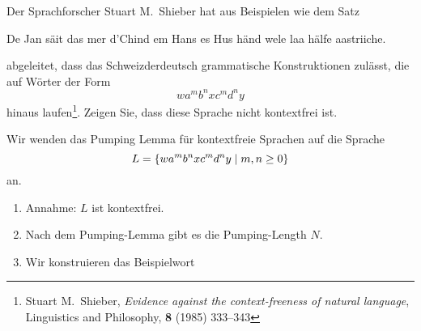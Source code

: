 Der Sprachforscher Stuart M.~Shieber hat aus Beispielen wie dem Satz
\begin{center}
De Jan säit das mer d'Chind em Hans es Hus händ wele laa hälfe aastriiche.
\end{center}
abgeleitet, dass das Schweizderdeutsch grammatische Konstruktionen
zulässt, die auf Wörter der Form
\[
wa^mb^nxc^md^ny
\]
hinaus laufen\footnote{Stuart M.~Shieber,
{\em Evidence against the context-freeness of natural language},
Linguistics and Philosophy, {\bf 8} (1985) 333--343}.
Zeigen Sie, dass diese Sprache nicht kontextfrei ist.


\begin{loesung}
Wir wenden das Pumping Lemma für kontextfreie Sprachen auf die Sprache
\[
L=\{
wa\mathstrut^mb\mathstrut^nxc\mathstrut^md\mathstrut^ny
\mid m,n\ge 0
\}
\]
an.
\begin{enumerate}
\item Annahme: $L$ ist kontextfrei.
\item Nach dem Pumping-Lemma gibt es die Pumping-Length $N$.
\item Wir konstruieren das Beispielwort
\begin{center}
\end{center}
\end{enumerate}
\end{loesung}
